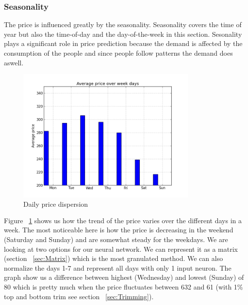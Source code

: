 \subsubsection{Seasonality}
The price is influenced greatly by the seasonality. Seasonality covers the time of year but also the time-of-day and the day-of-the-week in this section. Sesonality plays a significant role in price prediction because the demand is affected by the consumption of the people and since people follow patterns the demand does aswell.
\begin{figure}[H]
\centering
\includegraphics[width=0.8\textwidth ,natwidth=410,natheight=237]{billeder/energy_price_plots/Average_price_over_weekdays.png}
\caption{Daily price dispersion}
\label{fig:price_over_weekdays}
\end{figure}

Figure ~\ref{fig:price_over_weekdays} shows us how the trend of the price varies over the different days in a week. The most noticeable here is how the price is decreasing in the weekend (Saturday and Sunday) and are somewhat steady for the weekdays. We are looking at two options for our neural network. We can represent it as a matrix (section ~\ref{sec:Matrix}) which is the most granulated method. We can also normalize the days 1-7 and represent all days with only 1 input neuron.
The graph show us a difference between highest (Wednesday) and lowest (Sunday) of 80 which is pretty much when the price fluctuates between 632 and 61 (with 1\% top and bottom trim see section ~\ref{sec:Trimming}).

